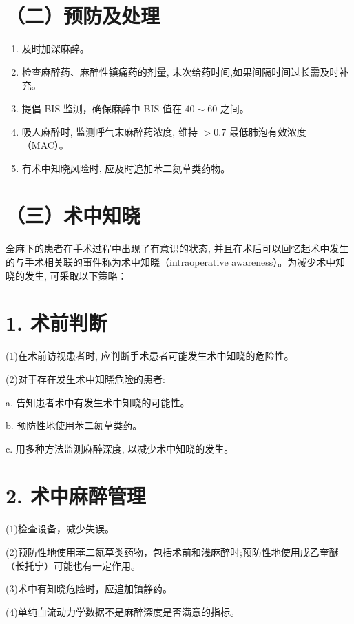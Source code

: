 \documentclass[10pt]{article}
\begin{document}
\section*{（二）预防及处理}
\begin{enumerate}
  \item 及时加深麻醉。

  \item 检查麻醉药、麻醉性镇痛药的剂量, 末次给药时间,如果间隔时间过长需及时补充。

  \item 提倡 BIS 监测，确保麻醉中 BIS 值在 $40 \sim 60$ 之间。

  \item 吸人麻醉时, 监测呼气末麻醉药浓度, 维持 $>0.7$ 最低肺泡有效浓度（MAC）。

  \item 有术中知晓风险时, 应及时追加苯二氮草类药物。

\end{enumerate}

\section*{（三）术中知晓}
全麻下的患者在手术过程中出现了有意识的状态, 并且在术后可以回忆起术中发生的与手术相关联的事件称为术中知晓（intraoperative awareness）。为减少术中知晓的发生, 可采取以下策略：

\section*{1. 术前判断}
(1)在术前访视患者时, 应判断手术患者可能发生术中知晓的危险性。

(2)对于存在发生术中知晓危险的患者:

a. 告知患者术中有发生术中知晓的可能性。

b. 预防性地使用苯二氮草类药。

c. 用多种方法监测麻醉深度, 以减少术中知晓的发生。

\section*{2. 术中麻醉管理}
(1)检查设备，减少失误。

(2)预防性地使用苯二氮草类药物，包括术前和浅麻醉时;预防性地使用戊乙奎醚（长托宁）可能也有一定作用。

(3)术中有知晓危险时，应追加镇静药。

(4)单纯血流动力学数据不是麻醉深度是否满意的指标。
\end{document}
